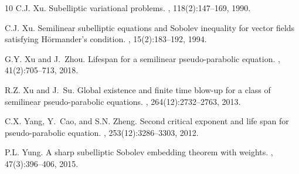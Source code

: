 \documentclass[11pt,a4paper]{article}
\numberwithin{equation}{section}
\numberwithin{remark}{section}
\begin{document}
\begin{thebibliography}{10}
C.J. Xu.
\newblock Subelliptic variational problems.
, 118(2):147--169, 1990.

C.J. Xu.
\newblock Semilinear subelliptic equations and {S}obolev inequality for vector
  fields satisfying {H}\"{o}rmander's condition.
, 15(2):183--192, 1994.

G.Y. Xu and J.~Zhou.
\newblock Lifespan for a semilinear pseudo-parabolic equation.
, 41(2):705--713, 2018.

R.Z. Xu and J.~Su.
\newblock Global existence and finite time blow-up for a class of semilinear
  pseudo-parabolic equations.
, 264(12):2732--2763, 2013.

C.X. Yang, Y.~Cao, and S.N. Zheng.
\newblock Second critical exponent and life span for pseudo-parabolic equation.
, 253(12):3286--3303, 2012.

P.L. Yung.
\newblock A sharp subelliptic {S}obolev embedding theorem with weights.
, 47(3):396--406, 2015.

\end{thebibliography}




\end{document}
